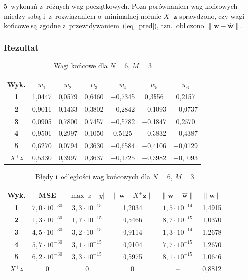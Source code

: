 \documentclass[12pt]{article}
\begin{document}
5~wykonań z~różnych wag początkowych. Poza porównaniem wag końcowych między sobą
i~z~rozwiązaniem o~minimalnej normie $X^{+}\mathbf{z}$ sprawdzono, czy wagi końcowe
są zgodne z~przewidywaniem~(\ref{eq_pred}), tzn.~obliczono $\|\mathbf{w}-\hat{\mathbf{w}}\|$.

\subsubsection{Rezultat}

\begin{table}[h!]
 \caption{Wagi końcowe dla $N=6$, $M=3$}
 \centering
 \vspace{0.2cm}
 \begin{tabular}{c c c c c c c}
  \hline\hline\\[-0.4cm]
  \textbf{Wyk.} & $w_1$ & $w_2$ & $w_3$ & $w_4$ & $w_5$ & $w_6$\\[0.1cm]
  \hline
  \textbf{1} & 1,0447 & 0,0579 & 0,6460 & $-$0,7345 & 0,3556 & 0,2157 \\
  \textbf{2} & 0,9011 & 0,1433 & 0,3802 & $-$0,2842 & $-$0,1093 & $-$0,0737 \\
  \textbf{3} & 0,0905 & 0,7800 & 0,7457 & $-$0,5782 & $-$0,1847 & 0,2570 \\
  \textbf{4} & 0,9501 & 0,2997 & 0,1050 & 0,5125 & $-$0,3832 & $-$0,4387 \\
  \textbf{5} & 0,6270 & 0,0794 & 0,3630 & $-$0,6584 & $-$0,4106 & $-$0,0129 \\
  \hline
  $X^{+}z$ & 0,5330 & 0,3997 & 0,3637 & $-$0,1725 & $-$0,3982 & $-$0,1093 \\[0.1cm]
  \hline
 \end{tabular}
 \label{tab_n6m3_w}
\end{table}

\begin{table}[h!]
 \caption{Błędy i~odległości wag końcowych dla $N=6$, $M=3$}
 \centering
 \vspace{0.2cm}
 \begin{tabular}{c c c c c c}
  \hline\hline\\[-0.4cm]
  \textbf{Wyk.} & \textbf{MSE} & $\max|z-y|$ & $\|\mathbf{w}-X^{+}\mathbf{z}\|$ & $\|\mathbf{w}-\hat{\mathbf{w}}\|$ & $\|\mathbf{w}\|$\\[0.1cm]
  \hline
  \textbf{1} & $7{,}0\cdot 10^{-30}$ & $3{,}3\cdot 10^{-15}$ & 1,2034 & $1{,}5\cdot 10^{-14}$ & 1,4915 \\
  \textbf{2} & $1{,}3\cdot 10^{-30}$ & $1{,}7\cdot 10^{-15}$ & 0,5466 & $8{,}7\cdot 10^{-15}$ & 1,0370 \\
  \textbf{3} & $4{,}5\cdot 10^{-30}$ & $3{,}2\cdot 10^{-15}$ & 0,9114 & $1{,}3\cdot 10^{-14}$ & 1,2678 \\
  \textbf{4} & $5{,}7\cdot 10^{-30}$ & $3{,}1\cdot 10^{-15}$ & 0,9104 & $7{,}7\cdot 10^{-15}$ & 1,2670 \\
  \textbf{5} & $6{,}2\cdot 10^{-30}$ & $3{,}3\cdot 10^{-15}$ & 0,5975 & $8{,}1\cdot 10^{-15}$ & 1,0646 \\
  \hline
  $X^{+}z$ & 0 & 0 & 0 & -- & 0,8812 \\[0.1cm]
  \hline
 \end{tabular}
 \label{tab_n6m3_e}
\end{table}
\end{document}
